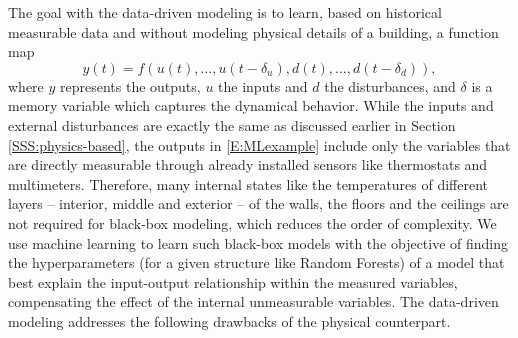 \textcolor[rgb]{0,0,1}{The goal with the data-driven modeling is to learn, based on historical measurable data and without modeling physical details of a building, a function map
\begin{equation}\label{E:MLexample}
	y(t) = f(u(t),\dots,u(t-\delta_u), d(t),\dots, d(t-\delta_d)),
\end{equation}
where \(y\) represents the outputs, \(u\) the inputs and \(d\) the disturbances, and \(\delta\) is a memory variable which captures the dynamical behavior.
While the inputs and external disturbances are exactly the same as discussed earlier in Section \ref{SSS:physics-based}, the outputs in \eqref{E:MLexample} include only the variables that are directly measurable through already installed sensors like thermostats and multimeters.
Therefore, many internal states like the temperatures of different layers -- interior, middle and exterior -- of the walls, the floors and the ceilings are not required for black-box modeling, which reduces the order of complexity.
We use machine learning to learn such black-box models with the objective of finding the hyperparameters (for a given structure like Random Forests) of a model that best explain the input-output relationship within the measured variables, compensating the effect of the internal unmeasurable variables. The data-driven modeling addresses the following drawbacks of the physical counterpart.}
